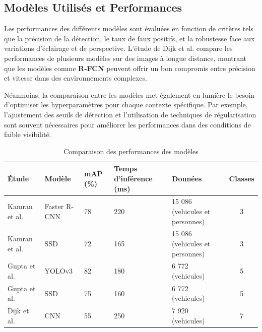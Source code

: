 \subsection{Modèles Utilisés et Performances}

Les performances des différents modèles sont évaluées en fonction de critères tels que la précision de la détection, le taux de faux positifs, et la robustesse face aux variations d'éclairage et de perspective. L'étude de Dijk et al. \cite{spie2020} compare les performances de plusieurs modèles sur des images à longue distance, montrant que les modèles comme \textbf{R-FCN} peuvent offrir un bon compromis entre précision et vitesse dans des environnements complexes.

Néanmoins, la comparaison entre les modèles met également en lumière le besoin d'optimiser les hyperparamètres pour chaque contexte spécifique. Par exemple, l'ajustement des seuils de détection et l'utilisation de techniques de régularisation sont souvent nécessaires pour améliorer les performances dans des conditions de faible visibilité.

\begin{table}[H]
    \centering
    \begin{tabularx}{\textwidth}{|p{3.1cm}|p{2.1cm}|p{1.1cm}|p{2.2cm}|X|c|}
        \hline
        \textbf{Étude}                  & \textbf{Modèle} & \textbf{mAP (\%)} & \textbf{Temps d'inférence (ms)} & \textbf{Données}                & \textbf{Classes} \\ \hline
        Kamran et al. \cite{kamran2020} & Faster R-CNN    & 78                & 220                             & 15 086 (vehicules et personnes) & 3                \\ \hline
        Kamran et al. \cite{kamran2020} & SSD             & 72                & 165                             & 15 086 (vehicules et personnes) & 3                \\ \hline
        Gupta et al. \cite{gupta2021}   & YOLOv3          & 82                & 180                             & 6 772  (vehicules)              & 5                \\ \hline
        Gupta et al. \cite{gupta2021}   & SSD             & 75                & 160                             & 6 772  (vehicules)              & 5                \\ \hline
        Dijk et al. \cite{spie2020}     & CNN             & 55                & 250                             & 7 920  (vehicules)              & 7                \\ \hline
    \end{tabularx}
    \caption{Comparaison des performances des modèles}
    \label{tab:comparaison}
\end{table}

